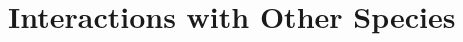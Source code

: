 \documentclass{beamer}
\numberwithin{equation}{section}		%
\numberwithin{figure}{section}		%
\numberwithin{table}{section}				%
\newcommand{\bd}{\string~/bio.data}   %
\newcommand{\bds}{\bd/bio.snowcrab}
\newcommand{\bdsa}{\bds/assessments}
\newcommand{\bdsay}{\bdsa/2016}
\newcommand{\yr}{2016}
\begin{document}
  

%
%
%
%	

\section{Interactions with Other Species}
\end{document}
